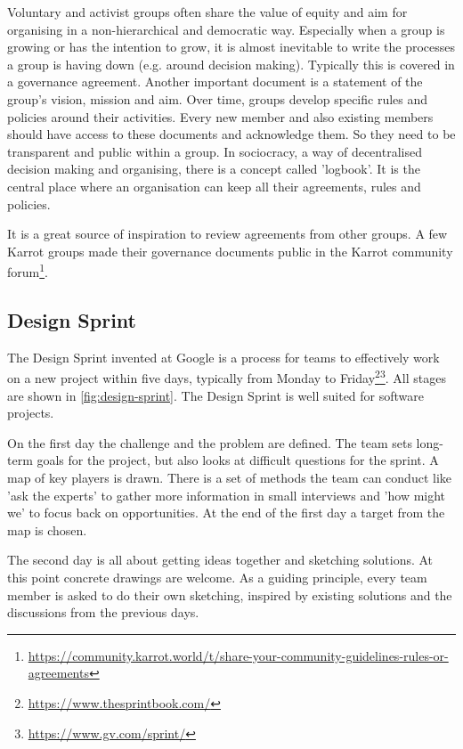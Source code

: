 \documentclass[
	a4paper,%
	11pt,%
	]{article}
\begin{document}
Voluntary and activist groups often share the value of equity and aim for organising in a non-hierarchical and democratic way. Especially when a group is growing or has the intention to grow, it is almost inevitable to write the processes a group is having down (e.g. around decision making). Typically this is covered in a governance agreement. Another important document is a statement of the group's vision, mission and aim. Over time, groups develop specific rules and policies around their activities. Every new member and also existing members should have access to these documents and acknowledge them. So they need to be transparent and public within a group. In sociocracy, a way of decentralised decision making and organising, there is a concept called 'logbook'. It is the central place where an organisation can keep all their agreements, rules and policies.

It is a great source of inspiration to review agreements from other groups. A few Karrot groups made their governance documents public in the Karrot community forum\footnote{\label{url:share_agreements2}\href{https://community.karrot.world/t/share-your-community-guidelines-rules-or-agreements}{https://community.karrot.world/t/share-your-community-guidelines-rules-or-agreements}}.
\subsection{Design Sprint}

The Design Sprint invented at Google is a process for teams to effectively work on a new project within five days, typically from Monday to Friday\footnote{\label{url:google_sprint}\url{https://www.thesprintbook.com/}}\footnote{\label{url:google_sprint_gv}\url{https://www.gv.com/sprint/}}. All stages are shown in \autoref{fig:design-sprint}. The Design Sprint is well suited for software projects.

On the first day the challenge and the problem are defined. The team sets long-term goals for the project, but also looks at difficult questions for the sprint. A map of key players is drawn.  There is a set of methods the team can conduct like 'ask the experts' to gather more information in small interviews and 'how might we' to focus back on opportunities. At the end of the first day a target from the map is chosen.

The second day is all about getting ideas together and sketching solutions. At this point concrete drawings are welcome. As a guiding principle, every team member is asked to do their own sketching, inspired by existing solutions and the discussions from the previous days.
\end{document}
